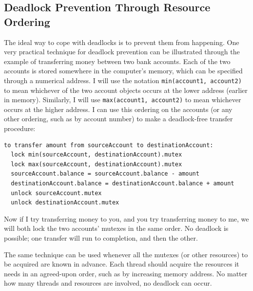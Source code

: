\subsection{Deadlock Prevention Through Resource Ordering}\label{deadlock-prevention-section}

The ideal way to cope with deadlocks is to prevent them from
happening.  One very practical technique for deadlock prevention can
be illustrated through the example of transferring money between two bank accounts.
Each of the two accounts is stored somewhere in the computer's
memory, which can be specified through a numerical address.  I will
use the notation \verb|min(account1, account2)| to mean whichever of
the two account objects occurs at the lower address (earlier in
memory). Similarly, I will use \verb|max(account1, account2)| to mean
whichever occurs at the higher address.  I can use this ordering on
the accounts (or any other ordering, such as by account number) to
make a deadlock-free transfer procedure:
\begin{verbatim}
to transfer amount from sourceAccount to destinationAccount:
  lock min(sourceAccount, destinationAccount).mutex
  lock max(sourceAccount, destinationAccount).mutex
  sourceAccount.balance = sourceAccount.balance - amount
  destinationAccount.balance = destinationAccount.balance + amount
  unlock sourceAccount.mutex
  unlock destinationAccount.mutex
\end{verbatim}

Now if I try transferring money to you, and you try transferring money
to me, we will both lock the two accounts' mutexes in the same order.
No deadlock is possible; one transfer will run to completion, and then
the other.

The same technique can be used whenever all the mutexes (or other
resources) to be acquired are known in advance.  Each thread should
acquire the resources it needs in an agreed-upon order, such as by
increasing memory address.  No matter how many threads and resources
are involved, no deadlock can occur.

